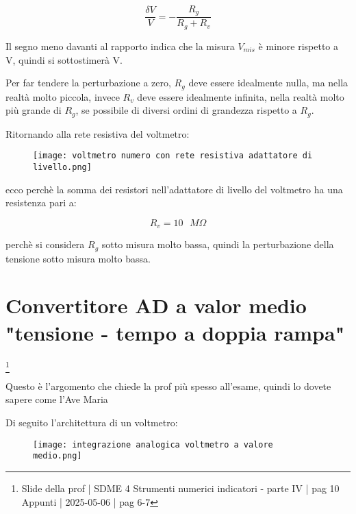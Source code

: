 {
    \Large 
    \begin{equation}
        \frac{\delta V}{V} 
        = 
        - \frac{R_g}{R_g + R_v}
    \end{equation}
}

Il segno meno davanti al rapporto indica che la misura $V_{mis}$ è minore rispetto a V, quindi si sottostimerà V. \newline 

Per far tendere la perturbazione a zero, $R_g$ deve essere idealmente nulla, ma nella realtà molto piccola, 
invece $R_v$ deve essere idealmente infinita, nella realtà molto più grande di $R_g$, se possibile di diversi ordini di grandezza rispetto a $R_g$. \newline 

Ritornando alla rete resistiva del voltmetro: 

\begin{figure}[h]
    \centering
    \texttt{[image: voltmetro numero con rete resistiva adattatore di livello.png]}
\end{figure}

ecco perchè la somma dei resistori nell'adattatore di livello del voltmetro ha una resistenza pari a: 

{
    \Large 
    \begin{equation}
        R_v = 10 \text{ }M \Omega
    \end{equation}
}

perchè si considera $R_g$ sotto misura molto bassa, quindi la perturbazione della tensione sotto misura molto bassa. \newline 

\newpage 

\section{Convertitore AD a valor medio "tensione - tempo a doppia rampa"}
\footnote{Slide della prof | SDME 4 Strumenti numerici indicatori - parte IV | pag 10\\  
Appunti | 2025-05-06 | pag 6-7}

\begin{tcolorbox}
    Questo è l'argomento che chiede la prof più spesso all'esame, quindi lo dovete sapere come l'Ave Maria
\end{tcolorbox}

Di seguito l'architettura di un voltmetro: 

\begin{figure}[h]
    \centering
    \texttt{[image: integrazione analogica voltmetro a valore medio.png]}
\end{figure}

